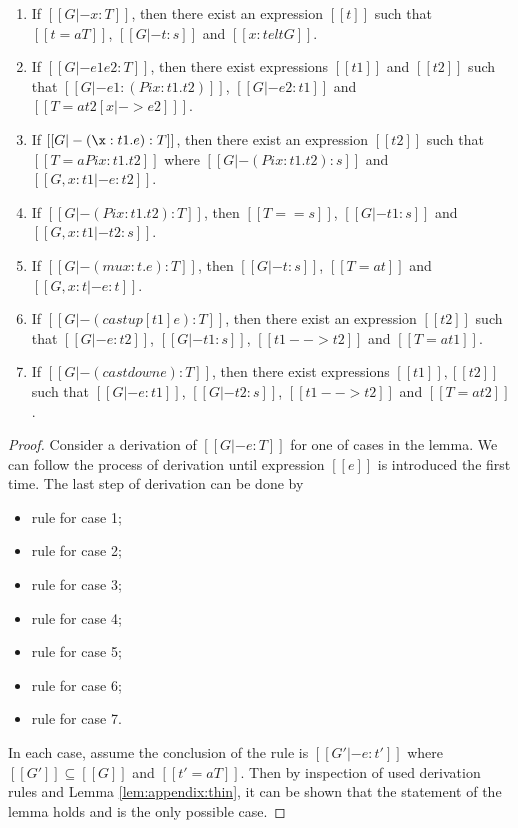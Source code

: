 \begin{lem}[Generation]\label{lem:appendix:gen}
$\quad$
\begin{enumerate}[(1)]
	\item If $[[G |- x:T]]$, then there exist an expression $[[t]]$ such that $[[t
=a T]]$, $[[G |- t:s]]$ and $[[x:t elt G]]$.
	\item If $[[G |- e1 e2:T]]$, then there exist expressions $[[t1]]$ and
$[[t2]]$ such that $[[G |- e1 : (Pi x:t1.t2)]]$, $[[G |- e2:t1]]$ and $[[T =a
t2[x |-> e2] ]]$.
	\item If $[[G |- (\x:t1.e):T]]$, then there exist an expression $[[t2]]$ such
that $[[T =a Pi x:t1.t2]]$ where $[[G |- (Pi x:t1.t2):s]]$ and $[[G,x:t1 |-
e:t2]]$.
    \item If $[[G |- (Pi x:t1.t2):T]]$, then $[[T == s]]$, $[[G |- t1:s]]$ and
$[[G, x:t1 |- t2:s]]$.
	\item If $[[G |- (mu x:t.e):T]]$, then $[[G |- t:s]]$, $[[T =a t]]$ and $[[G,
x:t|-e:t]]$.
	\item If $[[G |- (castup [t1] e):T]]$, then there exist an expression $[[t2]]$
such that $[[G |- e:t2]]$, $[[G |- t1:s]]$, $[[t1 --> t2]]$ and $[[T =a t1]]$.
	\item If $[[G |- (castdown e):T]]$, then there exist expressions
$[[t1]],[[t2]]$ such that $[[G |- e:t1]]$, $[[G |- t2:s]]$, $[[t1 --> t2]]$ and
$[[T =a t2]]$.
\end{enumerate}
\end{lem}

\begin{proof}
    Consider a derivation of $[[G |- e:T]]$ for one of cases in the lemma. We
can follow the process of derivation until expression $[[e]]$ is introduced the
first time. The last step of derivation can be done by
    \begin{itemize}
        \item rule  for case 1;
        \item rule  for case 2;
        \item rule  for case 3;
        \item rule  for case 4;
        \item rule  for case 5;
        \item rule  for case 6;
        \item rule  for case 7.
    \end{itemize}
    In each case, assume the conclusion of the rule is $[[G' |- e : t']]$ where
$[[G']] \subseteq [[G]]$ and $[[t' =a T]]$. Then by inspection of used
derivation rules and Lemma \ref{lem:appendix:thin}, it can be shown that the
statement of the lemma holds and is the only possible case.
\end{proof}

